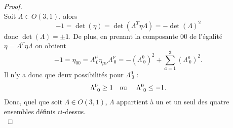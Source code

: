 \documentclass[a4paper,11pt]{report}
\theoremstyle{definition}
\theoremstyle{plain}
\theoremstyle{definition}
\theoremstyle{remark}
\begin{document}
            \begin{proof}
            ${}$\\
                Soit $\Lambda\in O(3,1)$, alors
                \begin{equation}
                    -1 = \det(\eta) = \det(\Lambda^T\eta\Lambda) = -\det(\Lambda)^2
                \end{equation}
                donc $\det(\Lambda) = \pm 1$. De plus, en prenant la composante $00$ de l'égalité $\eta = \Lambda^T\eta\Lambda$ on obtient
                \begin{equation}
                    -1 = \eta_{00} = \Lambda^\mu_{~0}\eta_{\mu\nu}\Lambda^\nu_{~0} = -(\Lambda^0_{~0})^2+\sum_{a=1}^3(\Lambda^a_{~0})^2.
                \end{equation}
                Il n'y a donc que deux possibilités pour $\Lambda^0_{~0}$ :
                \begin{equation}
                    \Lambda^0_{~0} \geq 1 \text{\quad ou \quad} \Lambda^0_{~0} \leq -1.
                \end{equation}
                Donc, quel que soit $\Lambda\in O(3,1)$, $\Lambda$ appartient à un et un seul des quatre ensembles définis ci-dessus.\\
                

\end{proof}
\end{document}
